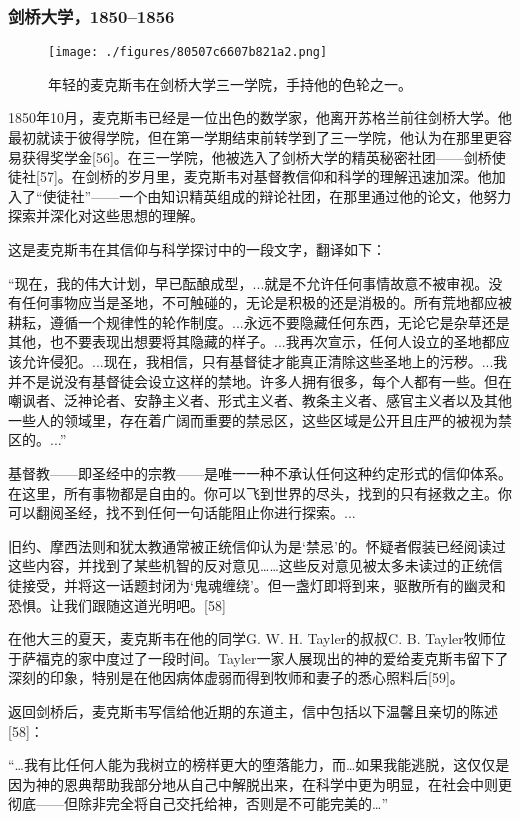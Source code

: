 \subsubsection{剑桥大学，1850–1856}
\begin{figure}[ht]
\centering
\texttt{[image: ./figures/80507c6607b821a2.png]}
\caption{年轻的麦克斯韦在剑桥大学三一学院，手持他的色轮之一。} \label{fig_Clerk_2}
\end{figure}
1850年10月，麦克斯韦已经是一位出色的数学家，他离开苏格兰前往剑桥大学。他最初就读于彼得学院，但在第一学期结束前转学到了三一学院，他认为在那里更容易获得奖学金[56]。在三一学院，他被选入了剑桥大学的精英秘密社团——剑桥使徒社[57]。在剑桥的岁月里，麦克斯韦对基督教信仰和科学的理解迅速加深。他加入了“使徒社”——一个由知识精英组成的辩论社团，在那里通过他的论文，他努力探索并深化对这些思想的理解。

这是麦克斯韦在其信仰与科学探讨中的一段文字，翻译如下：

“现在，我的伟大计划，早已酝酿成型，...就是不允许任何事情故意不被审视。没有任何事物应当是圣地，不可触碰的，无论是积极的还是消极的。所有荒地都应被耕耘，遵循一个规律性的轮作制度。...永远不要隐藏任何东西，无论它是杂草还是其他，也不要表现出想要将其隐藏的样子。...我再次宣示，任何人设立的圣地都应该允许侵犯。...现在，我相信，只有基督徒才能真正清除这些圣地上的污秽。...我并不是说没有基督徒会设立这样的禁地。许多人拥有很多，每个人都有一些。但在嘲讽者、泛神论者、安静主义者、形式主义者、教条主义者、感官主义者以及其他一些人的领域里，存在着广阔而重要的禁忌区，这些区域是公开且庄严的被视为禁区的。...”

基督教——即圣经中的宗教——是唯一一种不承认任何这种约定形式的信仰体系。在这里，所有事物都是自由的。你可以飞到世界的尽头，找到的只有拯救之主。你可以翻阅圣经，找不到任何一句话能阻止你进行探索。...

旧约、摩西法则和犹太教通常被正统信仰认为是‘禁忌’的。怀疑者假装已经阅读过这些内容，并找到了某些机智的反对意见……这些反对意见被太多未读过的正统信徒接受，并将这一话题封闭为‘鬼魂缠绕’。但一盏灯即将到来，驱散所有的幽灵和恐惧。让我们跟随这道光明吧。[58]

在他大三的夏天，麦克斯韦在他的同学G. W. H. Tayler的叔叔C. B. Tayler牧师位于萨福克的家中度过了一段时间。Tayler一家人展现出的神的爱给麦克斯韦留下了深刻的印象，特别是在他因病体虚弱而得到牧师和妻子的悉心照料后[59]。

返回剑桥后，麦克斯韦写信给他近期的东道主，信中包括以下温馨且亲切的陈述[58]：

“…我有比任何人能为我树立的榜样更大的堕落能力，而…如果我能逃脱，这仅仅是因为神的恩典帮助我部分地从自己中解脱出来，在科学中更为明显，在社会中则更彻底——但除非完全将自己交托给神，否则是不可能完美的…”

